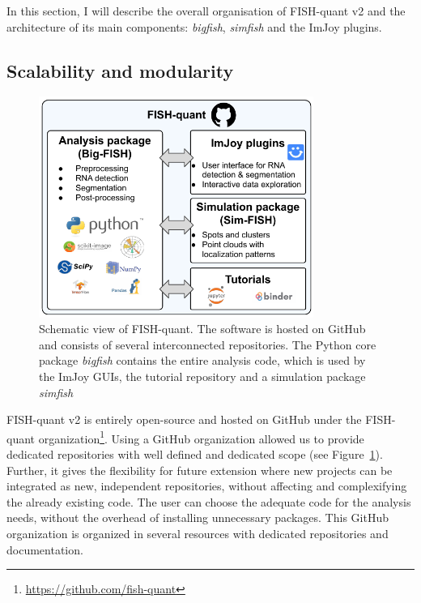In this section, I will describe the overall organisation of FISH-quant v2 and the architecture of its main components: \emph{bigfish}, \emph{simfish} and the ImJoy plugins.

\subsection{Scalability and modularity}
\label{subsec:framework}

\begin{figure}[]
    \centering
    \includegraphics[width=0.8\textwidth]{figures/chapter1/schema_fishquant}
    \caption[Schematic view of FISH-quant]{Schematic view of FISH-quant.
	The software is hosted on GitHub and consists of several interconnected repositories.
	The Python core package \emph{bigfish} contains the entire analysis code, which is used by the ImJoy GUIs, the tutorial repository and a simulation package \emph{simfish}}
    \label{fig:fishquant}
\end{figure}

FISH-quant v2 is entirely open-source and hosted on GitHub under the FISH-quant organization\footnote{\url{https://github.com/fish-quant}}.
Using a GitHub organization allowed us to provide dedicated repositories with well defined and dedicated scope (see Figure~\ref{fig:fishquant}).
Further, it gives the flexibility for future extension where new projects can be integrated as new, independent repositories, without affecting and complexifying the already existing code.
The user can choose the adequate code for the analysis needs, without the overhead of installing unnecessary packages.
This GitHub organization is organized in several resources with dedicated repositories and documentation.

